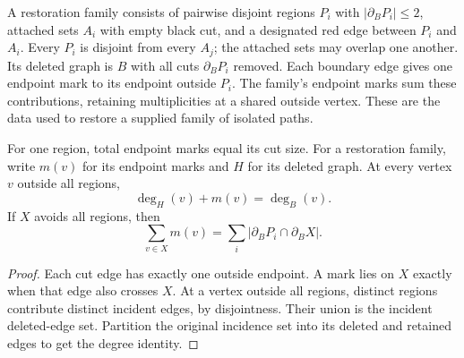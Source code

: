 \begin{definition}
  \label{def:lowerbounds-algebraic-restoration-family}
  \leanok
  A restoration family consists of pairwise disjoint regions $P_i$ with
  $|\partial_B P_i|\le2$, attached sets $A_i$ with empty black cut,
  and a designated red edge between $P_i$ and $A_i$. Every $P_i$ is
  disjoint from every $A_j$; the attached sets may overlap one another.
  Its deleted graph is $B$ with all cuts $\partial_B P_i$ removed.
  Each boundary edge gives one endpoint mark to its endpoint outside
  $P_i$. The family's endpoint marks sum these contributions, retaining
  multiplicities at a shared outside vertex.
  These are the data used to restore a supplied family of isolated paths.
\end{definition}

\begin{theorem}
  \label{thm:lowerbounds-algebraic-endpoint-marks}
  \leanok
  For one region, total endpoint marks equal its cut size. For a restoration
  family, write $m(v)$ for its endpoint marks and $H$ for its deleted graph.
  At every vertex $v$ outside all regions,
  \[
    \deg_H(v)+m(v)=\deg_B(v).
  \]
  If $X$ avoids all regions, then
  \[
    \sum_{v\in X}m(v)=\sum_i|\partial_B P_i\cap\partial_B X|.
  \]
\end{theorem}
\begin{proof}
  \leanok
  Each cut edge has exactly one outside endpoint. A mark lies on $X$
  exactly when that edge also crosses $X$. At a vertex outside all regions,
  distinct regions contribute distinct incident edges, by disjointness.
  Their union is the incident deleted-edge set. Partition the original
  incidence set into its deleted and retained edges to get the degree identity.
\end{proof}

